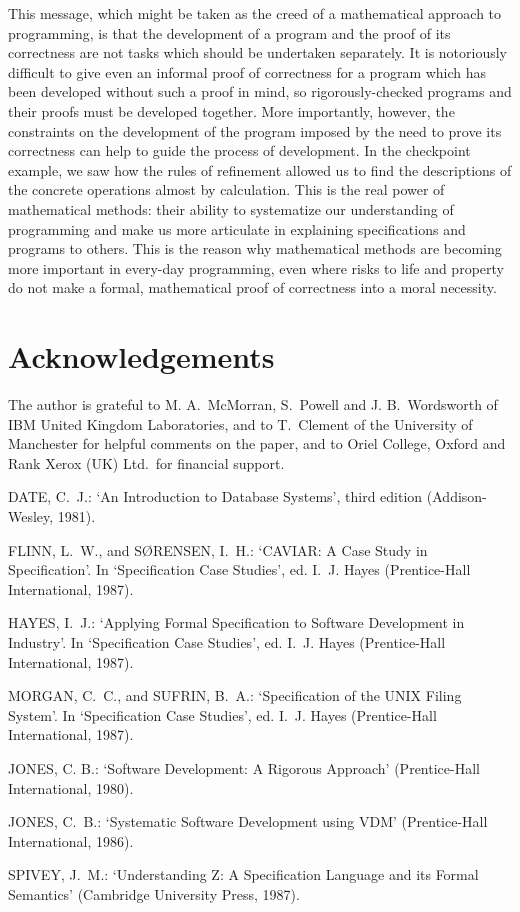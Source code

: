 \documentclass[12pt]{article}
\begin{document}
This message, which might be taken as the creed of a mathematical
approach to programming, is that the development of a program and the
proof of its correctness are not tasks which should be undertaken
separately. It is notoriously difficult to give even an informal proof
of correctness for a program which has been developed without such a
proof in mind, so rigorously-checked programs and their proofs must be
developed together.  More importantly, however, the constraints on the
development of the program imposed by the need to prove its
correctness can help to guide the process of development.  In the
checkpoint example, we saw how the rules of refinement allowed us to
find the descriptions of the concrete operations almost by
calculation.  This is the real power of mathematical methods: their
ability to systematize our understanding of programming and make us
more articulate in explaining specifications and programs to others.
This is the reason why mathematical methods are becoming more
important in every-day programming, even where risks to life and
property do not make a formal, mathematical proof of correctness into
a moral necessity.

\section*{Acknowledgements}

The author is grateful to M. A.~McMorran, S.~Powell and J.
B.~Wordsworth of IBM United Kingdom Laboratories, and to T.~Clement of
the University of Manchester for helpful comments on the paper, and to
Oriel College, Oxford and Rank Xerox (UK) Ltd.\ for financial
support.

\begin{thebibliography}{99}
\raggedright

DATE, C.~J.:
`An Introduction to Database Systems', third edition
(Addison-Wesley, 1981).

FLINN, L.~W., and S{\O}RENSEN, I.~H.:
`CAVIAR: A Case Study in Specification'.
In `Specification Case Studies', ed. I.~J. Hayes
(Prentice-Hall International, 1987).

HAYES, I.~J.:
`Applying Formal Specification to Software Development in Industry'.
In `Specification Case Studies', ed. I.~J. Hayes
(Prentice-Hall International, 1987).

MORGAN, C.~C., and SUFRIN, B.~A.:
`Specification of the UNIX Filing System'.
In `Specification Case Studies', ed. I.~J. Hayes
(Prentice-Hall International, 1987).

JONES, C. B.:
`Software Development: A Rigorous Approach'
(Prentice-Hall International, 1980).

JONES, C.~B.:
`Systematic Software Development using VDM'
(Prentice-Hall International, 1986).

SPIVEY, J.~M.:
`Understanding Z: A Specification Language and its Formal Semantics'
(Cambridge University Press, 1987).

\end{thebibliography}
\end{document}
